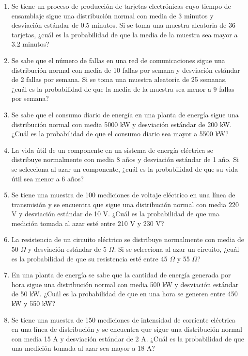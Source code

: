 \begin{Ejer}
\begin{enumerate}
    \item Se tiene un proceso de producción de tarjetas electrónicas cuyo tiempo de ensamblaje sigue una distribución normal con media de 3 minutos y desviación estándar de 0.5 minutos. Si se toma una muestra aleatoria de 36 tarjetas, ¿cuál es la probabilidad de que la media de la muestra sea mayor a 3.2 minutos?

    \item Se sabe que el número de fallas en una red de comunicaciones sigue una distribución normal con media de 10 fallas por semana y desviación estándar de 2 fallas por semana. Si se toma una muestra aleatoria de 25 semanas, ¿cuál es la probabilidad de que la media de la muestra sea menor a 9 fallas por semana?

    \item Se sabe que el consumo diario de energía en una planta de energía sigue una distribución normal con media 5000 kW y desviación estándar de 200 kW. ¿Cuál es la probabilidad de que el consumo diario sea mayor a 5500 kW?

    \item La vida útil de un componente en un sistema de energía eléctrica se distribuye normalmente con media 8 años y desviación estándar de 1 año. Si se selecciona al azar un componente, ¿cuál es la probabilidad de que su vida útil sea menor a 6 años?

    \item Se tiene una muestra de 100 mediciones de voltaje eléctrico en una línea de transmisión y se encuentra que sigue una distribución normal con media 220 V y desviación estándar de 10 V. ¿Cuál es la probabilidad de que una medición tomada al azar esté entre 210 V y 230 V?

    \item La resistencia de un circuito eléctrico se distribuye normalmente con media de 50 $\Omega$ y desviación estándar de 5 $\Omega$. Si se selecciona al azar un circuito, ¿cuál es la probabilidad de que su resistencia esté entre 45 $\Omega$ y 55 $\Omega$?

    \item En una planta de energía se sabe que la cantidad de energía generada por hora sigue una distribución normal con media 500 kW y desviación estándar de 50 kW. ¿Cuál es la probabilidad de que en una hora se generen entre 450 kW y 550 kW?

    \item Se tiene una muestra de 150 mediciones de intensidad de corriente eléctrica en una línea de distribución y se encuentra que sigue una distribución normal con media 15 A y desviación estándar de 2 A. ¿Cuál es la probabilidad de que una medición tomada al azar sea mayor a 18 A?

\end{enumerate}
\end{Ejer} 


